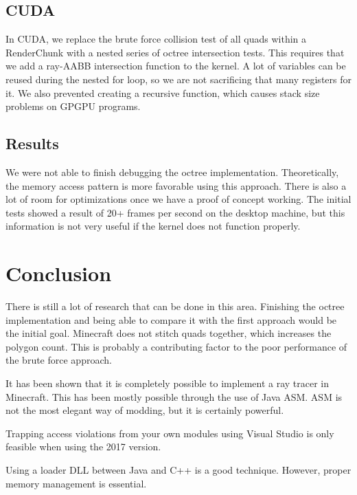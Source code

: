 \documentclass[]{article}
\begin{document}
\subsection{CUDA}
In CUDA, we replace the brute force collision test of all quads within a RenderChunk with a nested series of octree intersection tests.
This requires that we add a ray-AABB intersection function to the kernel.
A lot of variables can be reused during the nested for loop, so we are not sacrificing that many registers for it.
We also prevented creating a recursive function, which causes stack size problems on GPGPU programs.

\subsection{Results}
We were not able to finish debugging the octree implementation.
Theoretically, the memory access pattern is more favorable using this approach.
There is also a lot of room for optimizations once we have a proof of concept working.
The initial tests showed a result of 20+ frames per second on the desktop machine, but this information is not very useful if the kernel does not function properly.

\section{Conclusion}
There is still a lot of research that can be done in this area.
Finishing the octree implementation and being able to compare it with the first approach would be the initial goal.
Minecraft does not stitch quads together, which increases the polygon count.
This is probably a contributing factor to the poor performance of the brute force approach.

It has been shown that it is completely possible to implement a ray tracer in Minecraft.
This has been mostly possible through the use of Java ASM.
ASM is not the most elegant way of modding, but it is certainly powerful.

Trapping access violations from your own modules using Visual Studio is only feasible when using the 2017 version.

Using a loader DLL between Java and C++ is a good technique. However, proper memory management is essential.
\end{document}
